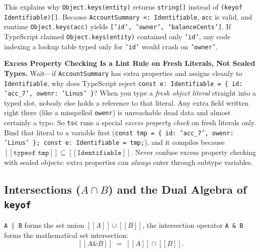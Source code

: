 This explains why \texttt{Object.keys(entity)} returns \texttt{string[]} instead of \texttt{(keyof Identifiable)[]}. Because \texttt{AccountSummary <: Identifiable}, \texttt{acc} is valid, and runtime \texttt{Object.keys(acc)} yields \texttt{['id', \allowbreak{}'owner', \allowbreak{}'balanceCents']}. If TypeScript claimed \texttt{Object.keys(entity)} contained only \texttt{'id'}, any code indexing a lookup table typed only for \texttt{'id'} would crash on \texttt{'owner'}.

\begin{trapbox}
\textbf{Excess Property Checking Is a Lint Rule on Fresh Literals, Not Sealed Types.} Wait---if \texttt{AccountSummary} has extra properties and assigns cleanly to \texttt{Identifiable}, why does TypeScript reject \texttt{const e: Identifiable = \{ id: 'acc\_7', owenr: 'Linus' \}}? When you type a \emph{fresh object literal} straight into a typed slot, nobody else holds a reference to that literal. Any extra field written right there (like a misspelled \texttt{owenr}) is unreachable dead data and almost certainly a typo. So \texttt{tsc} runs a special \emph{excess property check} on fresh literals only. Bind that literal to a variable first (\texttt{const tmp = \{ id: 'acc\_7', owenr: 'Linus' \}; const e: Identifiable = tmp;}), and it compiles because $[\![ \texttt{typeof tmp} ]\!] \subseteq [\![ \texttt{Identifiable} ]\!]$. Never confuse excess property checking with sealed objects: extra properties can \emph{always} enter through subtype variables.
\end{trapbox}

\subsection{Intersections ($A \cap B$) and the Dual Algebra of \texttt{keyof}}

\texttt{A | B} forms the set union $[\![ A ]\!] \cup [\![ B ]\!]$, the intersection operator \texttt{A \& B} forms the mathematical set intersection:
\[
  [\![ A \mathbin{\&} B ]\!] \;=\; [\![ A ]\!] \cap [\![ B ]\!].
\]

